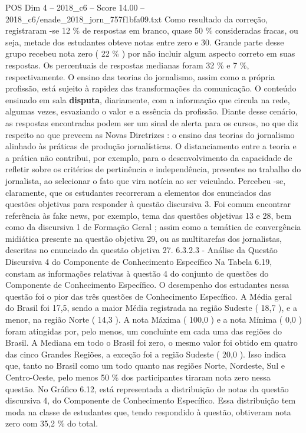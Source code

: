 \begin{textsample}{POS Dim 4 – 2018\_c6 – Score 14.00 – 2018\_c6/enade\_2018\_jorn\_757f1bfa09.txt}
Como resultado da correção, registraram -se 12 \% de respostas em branco, quase 50 \% consideradas fracas, ou seja, metade dos estudantes obteve notas entre zero e 30.
Grande parte desse grupo recebeu nota zero ( 22 \% ) por não incluir algum aspecto correto em suas respostas.
Os percentuais de respostas medianas foram 32 \% e 7 \%, respectivamente.
O ensino das teorias do jornalismo, assim como a própria profissão, está sujeito à rapidez das transformações da comunicação.
O conteúdo ensinado em sala \textbf{disputa}, diariamente, com a informação que circula na rede, algumas vezes, esvaziando o valor e a essência da profissão.
Diante desse cenário, as respostas encontradas podem ser um sinal de alerta para os cursos, no que diz respeito ao que preveem as Novas Diretrizes : o ensino das teorias do jornalismo alinhado às práticas de produção jornalísticas.
O distanciamento entre a teoria e a prática não contribui, por exemplo, para o desenvolvimento da capacidade de refletir sobre os critérios de pertinência e independência, presentes no trabalho do jornalista, ao selecionar o fato que vira notícia ao ser veiculado.
Percebeu -se, claramente, que os estudantes recorreram a elementos dos enunciados das questões objetivas para responder à questão discursiva 3.
Foi comum encontrar referência às fake news, por exemplo, tema das questões objetivas 13 e 28, bem como da discursiva 1 de Formação Geral ; assim como a temática de convergência midiática presente na questão objetiva 29, ou as multitarefas dos jornalistas, descritas no enunciado da questão objetiva 27. 6.3.2.3 - Análise da Questão Discursiva 4 do Componente de Conhecimento Específico Na Tabela 6.19, constam as informações relativas à questão 4 do conjunto de questões do Componente de Conhecimento Específico.
O desempenho dos estudantes nessa questão foi o pior das três questões de Conhecimento Específico.
A Média geral do Brasil foi 17,5, sendo a maior Média registrada na região Sudeste ( 18,7 ), e a menor, na região Norte ( 14,3 ).
A nota Máxima ( 100,0 ) e a nota Mínima ( 0,0 ) foram atingidas por, pelo menos, um concluinte em cada uma das regiões do Brasil.
A Mediana em todo o Brasil foi zero, o mesmo valor foi obtido em quatro das cinco Grandes Regiões, a exceção foi a região Sudeste ( 20,0 ).
Isso indica que, tanto no Brasil como um todo quanto nas regiões Norte, Nordeste, Sul e Centro-Oeste, pelo menos 50 \% dos participantes tiraram nota zero nessa questão.
No Gráfico 6.12, está representada a distribuição de notas da questão discursiva 4, do Componente de Conhecimento Específico.
Essa distribuição tem moda na classe de estudantes que, tendo respondido à questão, obtiveram nota zero com 35,2 \% do total.

\end{textsample}
